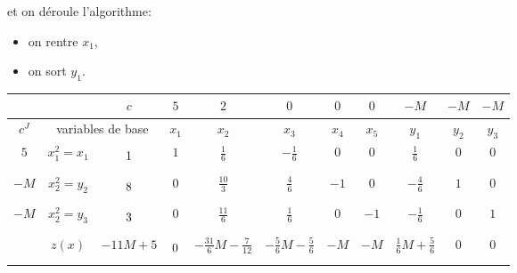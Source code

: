 \begin{td-sol}[]
\begin{enumerate}
        et on déroule l'algorithme:
        \begin{itemize}
            \item on rentre \(x_1\),
            \item on sort \(y_1\).
        \end{itemize}
        \begin{center}
            \begin{tabular}{|ccc|cccccccc|} %
                \hline  %
                & \ &\(c\)&\(5\)&\(2\)&\(0\)&\(0\)&\(0\)&\(-M\)&\(-M\)&\(-M\)\\
                \hline %
                \multicolumn{1}{|c|}{\(c^J\)}& \multicolumn{2}{c|}{variables de base}&\(x_1\)&\(x_2\)&\(x_3\)&\(x_4\)&\(x_5\)&\(y_1\)&\(y_2\)&\(y_3\)\\
                \hline %
                \multicolumn{1}{|c|}{\(5\)}& \multicolumn{1}{c|}{\(x_1^{2}=x_1\)} &\(\vphantom{\dfrac16}1\)&\(1\)&\(\frac16\)&\(-\frac16\)&\(0\)&\(0\)&\(\frac16\)&\(0\)&\(0\)\\
                \hline %
                \multicolumn{1}{|c|}{\(-M\)}& \multicolumn{1}{c|}{\(x_2^{2}=y_2\)} &\(\vphantom{\dfrac16}8\)&\(0\)&\(\frac{10}{3}\)&\(\frac46\)&\(-1\)&\(0\)&\(-\frac46\)&\(1\)&\(0\)\\
                \hline %
                \multicolumn{1}{|c|}{\(-M\)}& \multicolumn{1}{c|}{\(x_2^{2}=y_3\)} &\(\vphantom{\dfrac16}3\)&\(0\)&\(\frac{11}{6}\)&\(\frac16\)&\(0\)&\(-1\)&\(-\frac16\)&\(0\)&\(1\)\\
                \hline %
                \multicolumn{1}{|c|}{} &\(z(x)\)& \multicolumn{1}{|c|}{\(-11M+5\)} &\(\vphantom{\dfrac16}0\)&\(-\frac{31}6M-\frac7{12}\)&\(-\frac56M-\frac56\)&\(-M\)&\(-M\)&\(\frac16M+\frac56\)&\(0\)&\(0\)\\
                \hline %
            \end{tabular}
        \end{center}

    \end{enumerate}
\end{td-sol}

